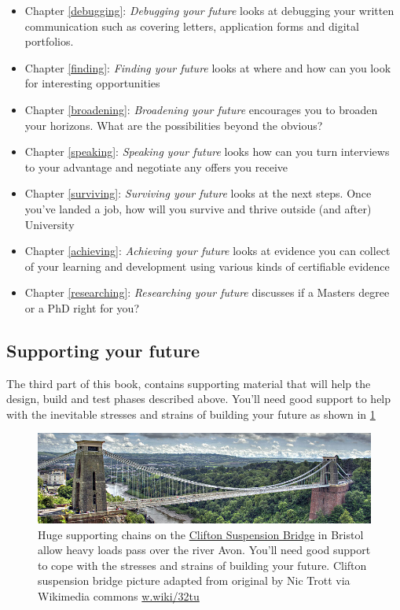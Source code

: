 \documentclass[
]{book}
\providecommand{\tightlist}{%
  \setlength{\itemsep}{0pt}\setlength{\parskip}{0pt}}
\begin{document}
\begin{itemize}
\tightlist
\item
  Chapter \ref{debugging}: \emph{Debugging your future} looks at debugging your written communication such as covering letters, application forms and digital portfolios.
\item
  Chapter \ref{finding}: \emph{Finding your future} looks at where and how can you look for interesting opportunities
\item
  Chapter \ref{broadening}: \emph{Broadening your future} encourages you to broaden your horizons. What are the possibilities beyond the obvious?
\item
  Chapter \ref{speaking}: \emph{Speaking your future} looks how can you turn interviews to your advantage and negotiate any offers you receive
\item
  Chapter \ref{surviving}: \emph{Surviving your future} looks at the next steps. Once you've landed a job, how will you survive and thrive outside (and after) University
\item
  Chapter \ref{achieving}: \emph{Achieving your future} looks at evidence you can collect of your learning and development using various kinds of certifiable evidence
\item
  Chapter \ref{researching}: \emph{Researching your future} discusses if a Masters degree or a PhD right for you?
\end{itemize}

\hypertarget{partiii}{%
\subsection{Supporting your future}\label{partiii}}

The third part of this book, contains supporting material that will help the design, build and test phases described above. You'll need good support to help with the inevitable stresses and strains of building your future as shown in \ref{fig:clifton-fig}

\begin{figure}

{\centering \includegraphics[width=1\linewidth]{images/clifton} 

}

\caption{Huge supporting chains on the \href{https://en.wikipedia.org/wiki/Clifton_Suspension_Bridge}{Clifton Suspension Bridge} in Bristol allow heavy loads pass over the river Avon. You'll need good support to cope with the stresses and strains of building your future. Clifton suspension bridge picture adapted from original by Nic Trott via Wikimedia commons \href{https://w.wiki/32tu}{w.wiki/32tu}}\label{fig:clifton-fig}
\end{figure}
\end{document}
